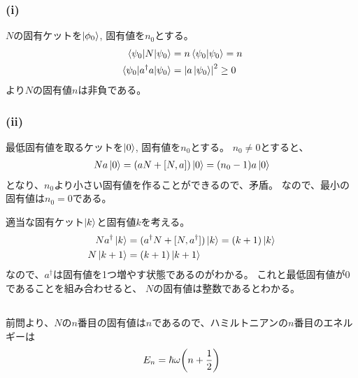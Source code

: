 \documentclass[../../sp_2018.tex]{subfiles}
\begin{document}
\subsubsection*{(i)}
\(N\)の固有ケットを\(\ket{\phi_0}\), 固有値を\(n_0\)とする。
\begin{equation}\begin{aligned}[b]
    \mel{\psi_0}{N}{\psi_0}&=n\braket{\psi_0}{\psi_0} = n\\
    \mel{\psi_0}{a^\dagger a}{\psi_0} &= \abs{a\ket{\psi_0}}^2 \geq 0
\end{aligned}\end{equation}
より\(N\)の固有値\(n\)は非負である。
\subsubsection*{(ii)}
最低固有値を取るケットを\(\ket{0}\), 固有値を\(n_0\)とする。
\(n_0\neq0\)とすると、
\begin{equation}\begin{aligned}[b]
    Na\ket{0} = (aN+[N,a])\ket{0}=(n_0-1)a\ket{0}
\end{aligned}\end{equation}
となり、\(n_0\)より小さい固有値を作ることができるので、矛盾。
なので、最小の固有値は\(n_0=0\)である。

適当な固有ケット\(\ket{k}\)と固有値\(k\)を考える。
\begin{equation}\begin{aligned}[b]
    Na^\dagger\ket{k} &= (a^\dagger N+[N,a^\dagger])\ket{k} = (k+1)\ket{k}\\
    N\ket{k+1} &= (k+1)\ket{k+1}
\end{aligned}\end{equation}
なので、\(a^\dagger\)は固有値を1つ増やす状態であるのがわかる。
これと最低固有値が\(0\)であることを組み合わせると、
\(N\)の固有値は整数であるとわかる。

\subsection{}
前問より、\(N\)の\(n\)番目の固有値は\(n\)であるので、ハミルトニアンの\(n\)番目のエネルギーは
\begin{equation}\begin{aligned}[b]
    E_n = \hbar\omega\qty(n+\frac{1}{2})
\end{aligned}\end{equation}
\end{document}
